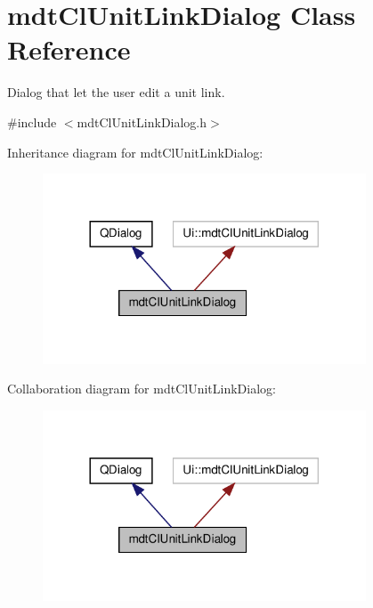 \hypertarget{classmdt_cl_unit_link_dialog}{\section{mdt\-Cl\-Unit\-Link\-Dialog Class Reference}
\label{classmdt_cl_unit_link_dialog}
}


Dialog that let the user edit a unit link.  




{\ttfamily \#include $<$mdt\-Cl\-Unit\-Link\-Dialog.\-h$>$}



Inheritance diagram for mdt\-Cl\-Unit\-Link\-Dialog\-:\nopagebreak
\begin{figure}[H]
\begin{center}
\leavevmode
\includegraphics[width=272pt]{classmdt_cl_unit_link_dialog__inherit__graph}
\end{center}
\end{figure}


Collaboration diagram for mdt\-Cl\-Unit\-Link\-Dialog\-:\nopagebreak
\begin{figure}[H]
\begin{center}
\leavevmode
\includegraphics[width=272pt]{classmdt_cl_unit_link_dialog__coll__graph}
\end{center}
\end{figure}
